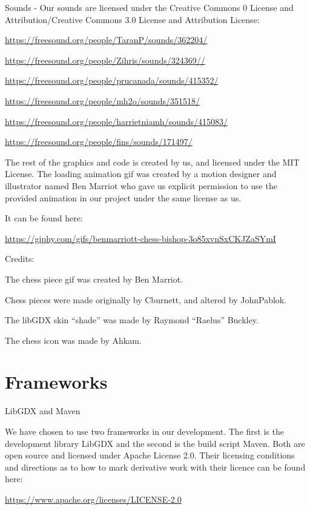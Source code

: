 \documentclass[a4paper, 11pt]{article}
\begin{document}
\vspace{7mm}
\noindent
Sounds -
Our sounds are licensed under the Creative Commons 0 License and Attribution/Creative Commons 3.0 License and Attribution License:

\vspace{3mm}
\noindent
\url{https://freesound.org/people/TaranP/sounds/362204/}

\vspace{3mm}
\noindent
\url{https://freesound.org/people/Zihris/sounds/324369//}

\vspace{3mm}
\noindent
\url{https://freesound.org/people/prucanada/sounds/415352/}


\vspace{3mm}
\noindent
\url{https://freesound.org/people/mh2o/sounds/351518/}

\vspace{3mm}
\noindent
\url{https://freesound.org/people/harrietniamh/sounds/415083/}

\vspace{3mm}
\noindent
\url{https://freesound.org/people/fins/sounds/171497/}

\newpage
\vspace{1mm}
\noindent
The rest of the graphics and code is created by us, and licensed under the MIT License. 
The loading animation gif was created by a motion designer and illustrator named Ben Marriot who gave us explicit permission to use the
provided animation in our project under the same license as us. 

\vspace{2mm}
\noindent
It can be found here:

\vspace{1mm}
\noindent
\url{https://giphy.com/gifs/benmarriott-chess-bishop-3o85xvnSxCKJZaSYmI}


\vspace{7mm}
\noindent
Credits:

\vspace{1mm}
\noindent
The chess piece gif was created by Ben Marriot. 

\noindent
Chess pieces were made originally by Cburnett, and altered by JohnPablok.

\noindent
The libGDX skin “shade” was made by Raymond “Raelus” Buckley. 

\noindent
The chess icon was made by Ahkam.

\vspace{10mm}

\section*{Frameworks}
LibGDX and Maven

\vspace{6mm}
\noindent
We have chosen to use two frameworks in our development. The first is the development library LibGDX and the second is the build script Maven. Both are open source and licensed under Apache License 2.0. Their licensing conditions and directions as to how to mark derivative work with their licence can be found here: 

\vspace{5 mm}
\noindent
\url{https://www.apache.org/licenses/LICENSE-2.0}
\end{document}
